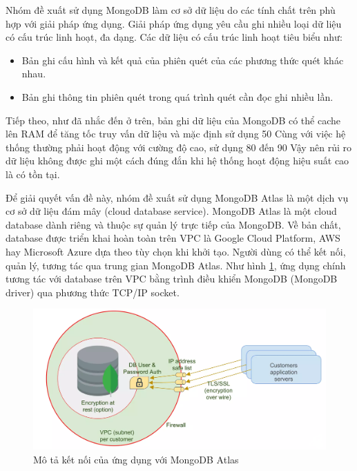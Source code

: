 Nhóm đề xuất sử dụng MongoDB làm cơ sở dữ liệu do các tính chất trên phù hợp với giải pháp ứng dụng.
Giải pháp ứng dụng yêu cầu ghi nhiều loại dữ liệu có cấu trúc linh hoạt, đa dạng.
Các dữ liệu có cấu trúc linh hoạt tiêu biểu như:

\begin{itemize}
      \item Bản ghi cấu hình và kết quả của phiên quét của các phương thức quét khác nhau.
      \item Bản ghi thông tin phiên quét trong quá trình quét cần đọc ghi nhiều lần.
\end{itemize}

Tiếp theo, như đã nhắc đến ở trên, bản ghi dữ liệu của MongoDB có thể cache lên RAM để tăng tốc truy vấn dữ liệu và mặc định sử dụng 50%
Cùng với việc hệ thống thường phải hoạt động với cường độ cao, sử dụng 80 đến 90%
Vậy nên rủi ro dữ liệu không được ghi một cách đúng đắn khi hệ thống hoạt động hiệu suất cao là có tồn tại.
\par

Để giải quyết vấn đề này, nhóm đề xuất sử dụng MongoDB Atlas là một dịch vụ cơ sở dữ liệu đám mây (cloud database service).
MongoDB Atlas là một cloud database dành riêng và thuộc sự quản lý trực tiếp của MongoDB.
Về bản chất, database được triển khai hoàn toàn trên VPC là Google Cloud Platform, AWS hay Microsoft Azure dựa theo tùy chọn khi khởi tạo.
Người dùng có thể kết nối, quản lý, tương tác qua trung gian MongoDB Atlas.
Như hình \ref{fig:KetNoiAtlas}, ứng dụng chính tương tác với database trên VPC bằng trình điều khiển MongoDB (MongoDB driver) qua phương thức TCP/IP socket.
\par

\begin{figure}[H]
      \centering
      \includegraphics[width=\textwidth]{applied-thesis-chapters/chapter-3/Mô tả kết nối của ứng dụng với MongoDB Atlas.png}
      \caption{Mô tả kết nối của ứng dụng với MongoDB Atlas}
      \label{fig:KetNoiAtlas}
\end{figure}

